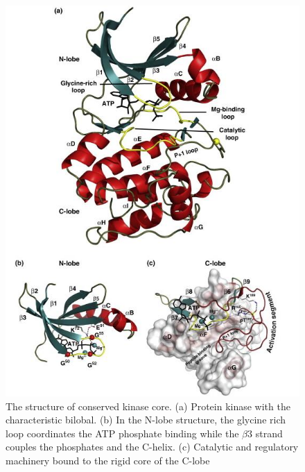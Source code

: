 \documentclass[a4paper, 11pt]{article}
\begin{document}
\begin{figure}[H]
	\includegraphics[width=.7\linewidth]{figures/proteinkinase.jpg}
	\centering
	\caption{The structure of conserved kinase core. (a) Protein kinase with the characteristic bilobal. (b) In the N-lobe structure, the glycine rich loop coordinates the ATP phosphate binding while the $\beta$3 strand couples the phosphates and the C-helix. (c) Catalytic and regulatory machinery bound to the rigid core of the C-lobe \cite{taylor2011protein}}
	\label{kinasestructure}
\end{figure}
\end{document}
